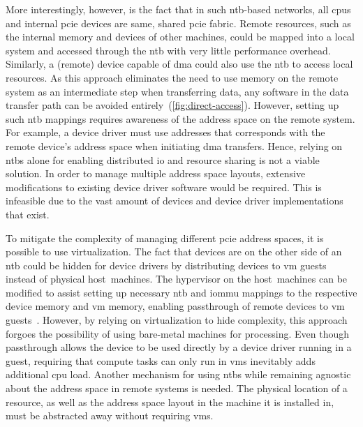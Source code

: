 More interestingly, however, is the fact that in such \gls{ntb}-based networks, all \glspl{cpu} and internal \gls{pcie} devices are same, shared \gls{pcie} fabric.
%
Remote resources, such as the internal memory and devices of other machines, could be mapped into a local system and accessed through the \gls{ntb} with very little performance overhead.
%
Similarly, a (remote) device capable of \gls{dma} could also use the \gls{ntb} to access local resources.
%
As this approach eliminates the need to use memory on the remote system as an intermediate step when transferring data, any software in the data transfer path can be avoided entirely~(\cref{fig:direct-access}).
%
However, setting up such \gls{ntb} mappings requires awareness of the address space on the remote system.
%
For example, a device driver must use addresses that corresponds with the remote device's address space when initiating \gls{dma} transfers.
%
Hence, relying on \glspl{ntb} alone for enabling distributed \gls{io} and resource sharing is not a viable solution.
%
In order to manage multiple address space layouts, extensive modifications to existing device driver software would be required.
%
This is infeasible due to the vast amount of devices and device driver implementations that exist.



To mitigate the complexity of managing different \gls{pcie} address spaces, it is possible to use virtualization.
%
The fact that devices are on the other side of an \gls{ntb} could be hidden for device drivers by distributing devices to \gls{vm} \glspl{guest} instead of physical host~machines.
%
The \gls{hypervisor} on the host~machines can be modified to assist setting up necessary \gls{ntb} and \gls{iommu} mappings to the respective device memory and \gls{vm} memory, enabling \gls{passthrough} of remote devices to \gls{vm} \glspl{guest}~\cite{Tu2013}.
%
However, by relying on virtualization to hide complexity, this approach forgoes the possibility of using bare-metal machines for processing.
%
Even though \gls{passthrough} allows the device to be used directly by a device driver running in a \gls{guest}, requiring that compute tasks can only run in \glspl{vm} inevitably adds additional \gls{cpu} load.
%
Another mechanism for using \glspl{ntb} while remaining agnostic about the address space in remote systems is needed. The physical location of a resource, as well as the address space layout in the machine it is installed in, must be abstracted away without requiring \glspl{vm}.



